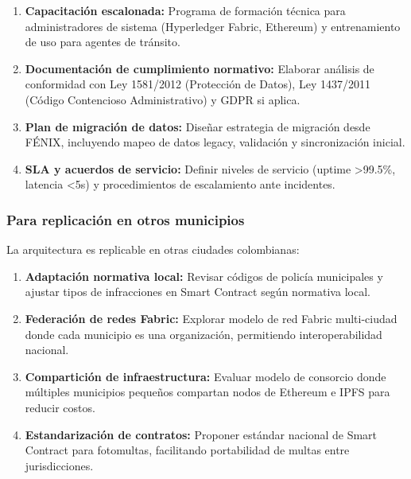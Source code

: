 \begin{enumerate}
    \item \textbf{Capacitación escalonada:} Programa de formación técnica para administradores de sistema (Hyperledger Fabric, Ethereum) y entrenamiento de uso para agentes de tránsito.
    
    \item \textbf{Documentación de cumplimiento normativo:} Elaborar análisis de conformidad con Ley 1581/2012 (Protección de Datos), Ley 1437/2011 (Código Contencioso Administrativo) y GDPR si aplica.
    
    \item \textbf{Plan de migración de datos:} Diseñar estrategia de migración desde FÉNIX, incluyendo mapeo de datos legacy, validación y sincronización inicial.
    
    \item \textbf{SLA y acuerdos de servicio:} Definir niveles de servicio (uptime >99.5\%, latencia <5s) y procedimientos de escalamiento ante incidentes.
\end{enumerate}

\subsubsection{Para replicación en otros municipios}

La arquitectura es replicable en otras ciudades colombianas:

\begin{enumerate}
    \item \textbf{Adaptación normativa local:} Revisar códigos de policía municipales y ajustar tipos de infracciones en Smart Contract según normativa local.
    
    \item \textbf{Federación de redes Fabric:} Explorar modelo de red Fabric multi-ciudad donde cada municipio es una organización, permitiendo interoperabilidad nacional.
    
    \item \textbf{Compartición de infraestructura:} Evaluar modelo de consorcio donde múltiples municipios pequeños compartan nodos de Ethereum e IPFS para reducir costos.
    
    \item \textbf{Estandarización de contratos:} Proponer estándar nacional de Smart Contract para fotomultas, facilitando portabilidad de multas entre jurisdicciones.
\end{enumerate}

